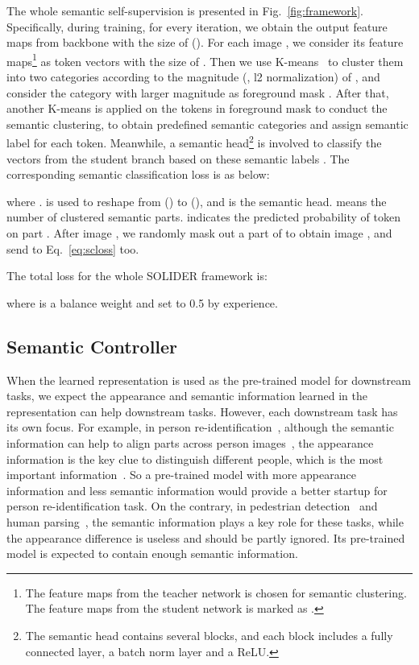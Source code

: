 \documentclass[10pt,twocolumn,letterpaper]{article}
\begin{document}
The whole semantic self-supervision is presented in Fig.~\ref{fig:framework}.
Specifically, during training, for every iteration, we obtain the output feature maps  from backbone with the size of (). For each image , we consider its feature maps\footnote{The feature maps  from the teacher network is chosen for semantic clustering. The feature maps from the student network is marked as .}  as  token vectors with the size of . Then we use K-means~\cite{kmeans} to cluster them into two categories according to the magnitude (\ie, l2 normalization) of , and consider the category with larger magnitude as foreground mask . After that, another K-means is applied on the tokens in foreground mask  to conduct the semantic clustering, to obtain  predefined semantic categories
and assign semantic label  for each token. Meanwhile, a semantic head\footnote{The semantic head contains several blocks, and each block includes a fully connected layer, a batch norm layer and a ReLU. } is involved to classify the vectors  from the student branch based on these semantic labels . The corresponding semantic classification loss is as below:


where .  is used to reshape  from () to (), and  is the semantic head.  means the number of clustered semantic parts.  indicates the predicted probability of token  on part . After image , we randomly mask out a part of  to obtain image , and send  to Eq.~\ref{eq:scloss} too. 

The total loss for the whole SOLIDER framework is:

where  is a balance weight and set to 0.5 by experience.

\subsection{Semantic Controller}
\label{ssec:control}

When the learned representation is used as the pre-trained model for downstream tasks, we expect the appearance and semantic information learned in the representation can help downstream tasks. However, each downstream task has its own focus. For example, in person re-identification~\cite{reidsurvey1,reidsurvey2}, although the semantic information can help to align parts across person images~\cite{suh2018part,zhang2017alignedreid}, the appearance information is the key clue to distinguish different people, which is the most important information~\cite{yang2016metric,zheng2019joint}. So a pre-trained model with more appearance information and less semantic information would provide a better startup for person re-identification task. On the contrary, in pedestrian detection~\cite{detsurvey1,detsurvey2} and human parsing~\cite{parsesurvey1,lip,schp}, the semantic information plays a key role for these tasks, while the appearance difference is useless and should be partly ignored. Its pre-trained model is expected to contain enough semantic information. 
\end{document}
